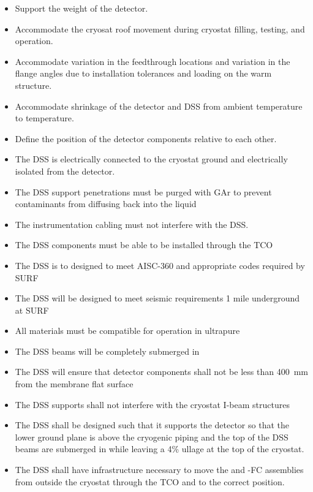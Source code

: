 \begin{itemize}
 \setlength\itemsep{1mm}
\setlength{\parsep}{1mm}
\setlength{\itemsep}{-5mm}
\item Support the weight of the detector.
\item Accommodate the cryosat roof movement during cryostat filling, testing, and operation.
\item Accommodate variation in the feedthrough locations and
  variation in the flange angles due to installation tolerances and
  loading on the warm structure.
\item Accommodate shrinkage of the detector and DSS from ambient
  temperature to  temperature.
\item Define the position of the detector components relative to each other. 
\item The DSS is electrically connected to the cryostat ground and electrically isolated from the detector.
\item The DSS support penetrations must be purged with GAr to prevent contaminants from diffusing back into the liquid
\item The instrumentation cabling must not interfere with the DSS.
\item The DSS components must be able to be installed through the TCO
\item The DSS is to designed to meet AISC-360 and appropriate codes required by SURF
\item The DSS will be designed to meet seismic requirements 1 mile underground at SURF
\item All materials must be compatible for operation in ultrapure 
\item The DSS beams will be completely submerged in 
\item The DSS will ensure that detector components shall not be less than \SI{400}{mm} from the membrane flat surface
\item The DSS supports shall not interfere with the cryostat I-beam structures
\item The DSS shall be designed such that it supports the detector so that the lower ground plane is above the cryogenic piping and the top of the DSS beams are submerged in  while leaving a 4\% ullage at the top of the cryostat.
\item The DSS shall have infrastructure necessary to move the  and -FC assemblies from outside the cryostat through the TCO and to the correct position.
\end{itemize}

